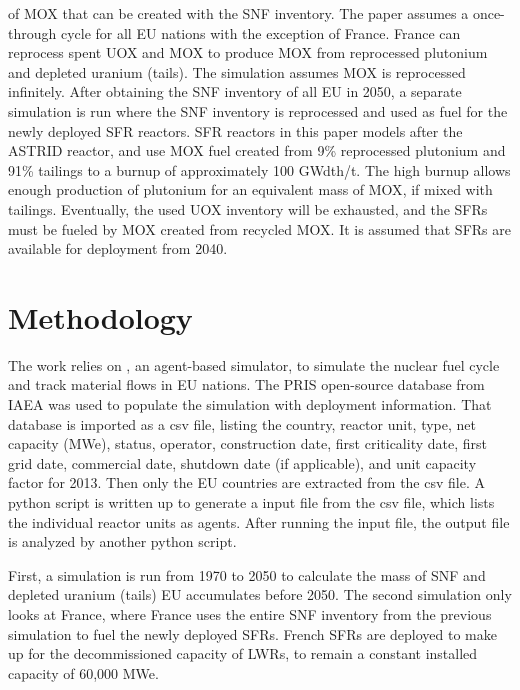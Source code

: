 of \gls{MOX} that can be created with the \gls{SNF} inventory.
The paper assumes a once-through cycle for all 
\gls{EU} nations with the exception of France. France can reprocess spent \gls{UOX} and \gls{MOX} to
produce \gls{MOX} from reprocessed plutonium and depleted uranium (tails).
The simulation assumes \gls{MOX} is reprocessed infinitely. 
After obtaining the \gls{SNF} inventory of all \gls{EU} in 2050, a separate
simulation is run where the \gls{SNF} inventory is reprocessed and
used as fuel for the newly deployed \gls{SFR} reactors.
\gls{SFR} reactors in this paper models after the ASTRID reactor,
and use \gls{MOX} fuel created from 9\% reprocessed plutonium
and 91\% tailings to a burnup
of approximately 100 GWdth/t. The high burnup allows enough production of plutonium
for an equivalent mass of \gls{MOX}, if mixed with tailings.  Eventually,
the used \gls{UOX} inventory will be exhausted, and the \glspl{SFR} must be
fueled by \gls{MOX} created from recycled \gls{MOX}.
It is assumed that \glspl{SFR} are available for deployment
from 2040. 


\section{Methodology}
The work relies on \Cyclus, an agent-based simulator, to simulate the nuclear fuel cycle
and track material flows in \gls{EU} nations. The \gls{PRIS} open-source 
database from \gls{IAEA} was used to populate the simulation with deployment 
information. That database is imported as a csv file, listing the country, reactor unit, type, net capacity (MWe), status,
operator, construction date, first criticality date, first grid date, commercial date, shutdown
date (if applicable), and unit capacity factor for 2013. Then only the \gls{EU} countries are extracted
from the csv file. A python script is written up to generate a \Cyclus input file from the csv file,
which lists the individual reactor units as agents. After running the \Cyclus input file,
the output file is analyzed by another python script.

First, a simulation is run from 1970 to 2050 to calculate the mass of 
\gls{SNF} and depleted uranium (tails) \gls{EU} accumulates before 2050. 
The second simulation only looks at France, where France
uses the entire \gls{SNF} inventory from the previous
simulation to fuel
the newly deployed \glspl{SFR}. French \gls{SFR}s are deployed
to make up for the decommissioned capacity of \gls{LWR}s, to
remain a constant installed capacity of 60,000 MWe.

